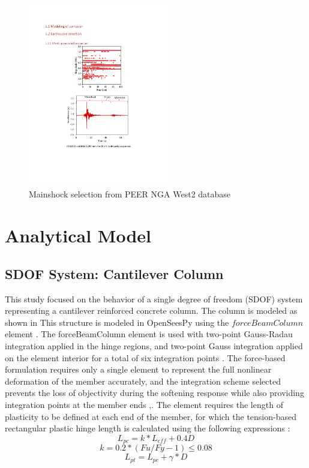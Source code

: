 \begin{figure}[htbp]
	\centering
	\includegraphics[width=0.55\textwidth]{Chapter-5/figs/MS_AS_Figure.pdf}
	\caption{Mainshock selection from PEER NGA West2 database}
	\label{fig:MS-AS_sequence_sample}
\end{figure}

\section{Analytical Model}
\subsection{SDOF System: Cantilever Column}
This study focused on the behavior of a single degree of freedom (SDOF) system representing a cantilever reinforced concrete column. The column is modeled as shown in  This structure is modeled in OpenSeesPy \cite{McKenna2010}\cite{Zhu2018} using the $forceBeamColumn$ element \cite{Scott}. The forceBeamColumn element is used with two-point Gauss-Radau integration applied in the hinge regions, and two-point Gauss integration applied on the element interior for a total of six integration points \cite{Scott}. The force-based formulation requires only a single element to represent the full nonlinear deformation of the member accurately, and the integration scheme selected prevents the loss of objectivity during the softening response while also providing integration points at the member ends \cite{Calabrese2010},\cite{Scott}. The element requires the length of plasticity to be defined at each end of the member, for which the tension-based rectangular plastic hinge length is calculated using the following expressions \cite{Goodnight2013}:
\begin{equation}
    L_{pc}=k*L_{eff} + 0.4D
    \label{eq:LP_Comp}
\end{equation}
\begin{equation}
	k=0.2*(Fu/Fy - 1) \leqslant 0.08
	\label{eq:K_Lp}
\end{equation}
\begin{equation}
    L_{pt}=L_{pc}+\gamma*D
    \label{eq:LP_Tension}
\end{equation}

